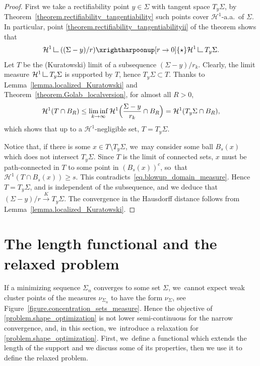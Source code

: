 \documentclass[10pt]{amsart}
\theoremstyle{definition}
\newcommand\LM[1]{\hbox{\vrule width.5pt \vbox to#1pt{\vfill \hrule width#1pt height.5pt}}}
\newcommand\LL{{\mathchoice {\>\LM7\>}{\>\LM7\>}{\,\LM5\,}{\,\LM{3.35}\,}}}
\newcommand{\mres}{\LL}
\newcommand\cH{\mathcal{H}}
\begin{document}
\begin{proof}
First we take a rectifiability point $y \in \Sigma$ with tangent space $T_y\Sigma$,
by Theorem~\ref{theorem.rectifiability_tangentiability} such points cover $\cH^1$-a.a.~of $\Sigma$.
In particular, point \eqref{theorem.rectifiability_tangentiabilityii} of the theorem shows that
\[
\cH^1\mres((\Sigma-y)/r)\xrightharpoonup[r \to 0]{\star} \cH^1\mres T_y\Sigma.
\]
Let $T$ be the (Kuratowski) limit of a subsequence $(\Sigma-y)/r_k$.
Clearly, the limit measure $\cH^1\mres T_y\Sigma$ is supported by $T$, hence $T_y\Sigma\subset T$.
Thanks
to Lemma~\ref{lemma.localized_Kuratowski} and Theorem~\ref{theorem.Golab_localversion}, for
almost all $R>0$,
\begin{equation}
\cH^1(T\cap B_R) \le \liminf_{k\to\infty} \cH^1\Bigl(\frac{\Sigma-y}{r_k}\cap B_R\Bigr)
= \cH^1(T_y\Sigma\cap B_R),\label{eq.blowup_domain_measure}
\end{equation}
which shows that up to a $\cH^1$-negligible set, $T=T_y\Sigma$.

Notice that, if there is some $x \in T\setminus T_y\Sigma$, we~may consider some ball $B_s(x)$ which does not intersect $T_y\Sigma$. Since $T$ is the limit of connected sets, $x$ must be path-connected in $T$ to some point in $(B_s(x))^c$, so~that $\cH^1(T\cap B_s(x))\ge s$. This contradicts~\eqref{eq.blowup_domain_measure}. Hence $T=T_y\Sigma$, and is independent of the subsequence, and we deduce that $(\Sigma-y)/r\stackrel{K}{\to} T_y\Sigma$. The convergence in the Hausdorff distance follows from Lemma~\ref{lemma.localized_Kuratowski}.
\end{proof}

\section{The length functional and the relaxed problem}\label{section.the_problem}
If a minimizing sequence $\Sigma_n$ converges to some set $\Sigma$, we~cannot expect weak cluster points of the measures $\nu_{\Sigma_n}$ to have the form $\nu_\Sigma$, see Figure~\ref{figure.concentration_sets_measure}. Hence the objective of \eqref{problem.shape_optimization} is not lower semi-continuous for the narrow convergence, and, in this section, we~introduce a relaxation for \eqref{problem.shape_optimization}. First, we~define a functional which extends the length of the support and we discuss some of its properties, then we use it to define the relaxed problem.
\end{document}
